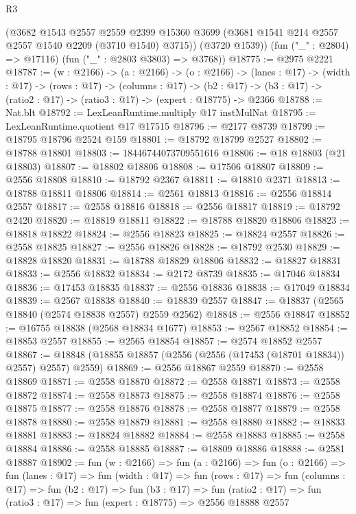 \begin{lexlean}{R3}
\begin{coremodule}
        (@3682
          @1543
          @2557
          @2559
          @2399
          @15360
          @3699
          (@3681 @1541 @214 @2557 @2557 @1540 @2209 (@3710 @1540) @3715))
        (@3720 @1539))
      (fun ("_" : @2804) => @17116)
      (fun ("_" : @2803 @3803) => @3768))
@18775 := @2975 @2221
@18787 := (w : @2166) ->
  (a : @2166) ->
  (o : @2166) ->
  (lanes : @17) ->
  (width : @17) ->
  (rows : @17) ->
  (columns : @17) ->
  (b2 : @17) -> (b3 : @17) -> (ratio2 : @17) -> (ratio3 : @17) -> (expert : @18775) -> @2366
@18788 := Nat.blt
@18792 := LexLeanRuntime.multiply @17 instMulNat
@18795 := LexLeanRuntime.quotient @17 @17515
@18796 := @2177 @8739
@18799 := @18795 @18796 @2524 @159
@18801 := @18792 @18799 @2527
@18802 := @18788 @18801
@18803 := 18446744073709551616
@18806 := @18 @18803 (@21 @18803)
@18807 := @18802 @18806
@18808 := @17506 @18807
@18809 := @2556 @18808
@18810 := @18792 @2367
@18811 := @18810 @2371
@18813 := @18788 @18811 @18806
@18814 := @2561 @18813
@18816 := @2556 @18814 @2557
@18817 := @2558 @18816
@18818 := @2556 @18817
@18819 := @18792 @2420
@18820 := @18819 @18811
@18822 := @18788 @18820 @18806
@18823 := @18818 @18822
@18824 := @2556 @18823
@18825 := @18824 @2557
@18826 := @2558 @18825
@18827 := @2556 @18826
@18828 := @18792 @2530
@18829 := @18828 @18820
@18831 := @18788 @18829 @18806
@18832 := @18827 @18831
@18833 := @2556 @18832
@18834 := @2172 @8739
@18835 := @17046 @18834
@18836 := @17453 @18835
@18837 := @2556 @18836
@18838 := @17049 @18834
@18839 := @2567 @18838
@18840 := @18839 @2557
@18847 := @18837 (@2565 @18840 (@2574 @18838 @2557) @2559 @2562)
@18848 := @2556 @18847
@18852 := @16755 @18838 (@2568 @18834 @1677)
@18853 := @2567 @18852
@18854 := @18853 @2557
@18855 := @2565 @18854
@18857 := @2574 @18852 @2557
@18867 := @18848 (@18855 @18857 (@2556 (@2556 (@17453 (@18701 @18834)) @2557) @2557) @2559)
@18869 := @2556 @18867 @2559
@18870 := @2558 @18869
@18871 := @2558 @18870
@18872 := @2558 @18871
@18873 := @2558 @18872
@18874 := @2558 @18873
@18875 := @2558 @18874
@18876 := @2558 @18875
@18877 := @2558 @18876
@18878 := @2558 @18877
@18879 := @2558 @18878
@18880 := @2558 @18879
@18881 := @2558 @18880
@18882 := @18833 @18881
@18883 := @18824 @18882
@18884 := @2558 @18883
@18885 := @2558 @18884
@18886 := @2558 @18885
@18887 := @18809 @18886
@18888 := @2581 @18887
@18902 := fun (w : @2166) =>
  fun (a : @2166) =>
  fun (o : @2166) =>
  fun (lanes : @17) =>
  fun (width : @17) =>
  fun (rows : @17) =>
  fun (columns : @17) =>
  fun (b2 : @17) =>
  fun (b3 : @17) =>
  fun (ratio2 : @17) => fun (ratio3 : @17) => fun (expert : @18775) => @2556 @18888 @2557

\end{coremodule}
\end{lexlean}
